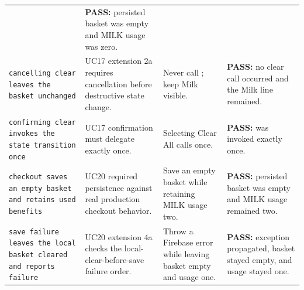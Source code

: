 \documentclass[sigconf]{acmart}
\begin{document}
\begin{table}[!p]
\begin{tabular}{@{}L{0.26\textwidth}L{0.21\textwidth}L{0.20\textwidth}L{0.27\textwidth}@{}}
      & \textbf{PASS:} persisted basket was empty and MILK usage was zero. \\
    \texttt{cancelling clear leaves the basket unchanged}
      & UC17 extension 2a requires cancellation before destructive state change.
      & Never call ; keep Milk visible.
      & \textbf{PASS:} no clear call occurred and the Milk line remained. \\
    \texttt{confirming clear invokes the state transition once}
      & UC17 confirmation must delegate exactly once.
      & Selecting Clear All calls  once.
      & \textbf{PASS:}  was invoked exactly once. \\
    \texttt{checkout saves an empty basket and retains used benefits}
      & UC20 required persistence against real production checkout behavior.
      & Save an empty basket while retaining MILK usage two.
      & \textbf{PASS:} persisted basket was empty and MILK usage remained two. \\
    \texttt{save failure leaves the local basket cleared and reports failure}
      & UC20 extension 4a checks the local-clear-before-save failure order.
      & Throw a Firebase error while leaving basket empty and usage one.
      & \textbf{PASS:} exception propagated, basket stayed empty, and usage stayed one. \\
    \bottomrule
  \end{tabular}
\end{table}
\FloatBarrier
\end{document}
